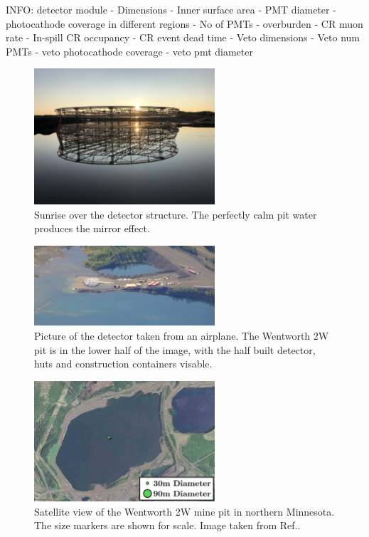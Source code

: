 INFO: detector module
- Dimensions
- Inner surface area
- PMT diameter
- photocathode coverage in different regions
- No of PMTs
- overburden
- CR muon rate
- In-spill CR occupancy
- CR event dead time
- Veto dimensions
- Veto num PMTs
- veto photocathode coverage
- veto pmt diameter

\begin{figure} %
    \includegraphics[width=0.6\textwidth]{diagrams/4-chips/sunrise.jpeg}
    \caption[Sunrise over the \chips detector.]
    {Sunrise over the \chips detector structure. The perfectly calm pit water
        produces the mirror effect.}
    \label{fig:sunrise}
\end{figure}

\begin{figure} %
    \includegraphics[width=0.6\textwidth]{diagrams/4-chips/from_the_sky.jpg}
    \caption[Picture of the \chips detector from the air.]
    {Picture of the \chips detector taken from an airplane. The Wentworth 2W pit is in the lower
        half of the image, with the half built detector, huts and construction containers
        visable.}
    \label{fig:from_the_sky}
\end{figure}

\begin{figure} %
    \includegraphics[width=0.6\textwidth]{diagrams/4-chips/location.png}
    \caption[Satellite view of the Wentworth 2W mine pit.]
    {Satellite view of the Wentworth 2W mine pit in northern Minnesota.
        The size markers are shown for scale. Image taken from Ref.\cite{adamson2013}.}
    \label{fig:location}
\end{figure}

